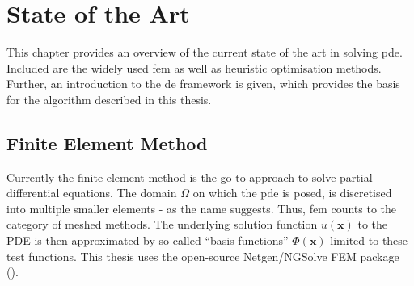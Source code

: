 \documentclass[./\jobname.tex]{subfiles}
\begin{document}
\chapter{State of the Art}
\label{chap:state_of_the_art}
This chapter provides an overview of the current state of the art in solving \gls{pde}. Included are the widely used \gls{fem} as well as heuristic optimisation methods. Further, an introduction to the \gls{de} framework is given, which provides the basis for the algorithm described in this thesis. 

\section{Finite Element Method}
Currently the finite element method is the go-to approach to solve partial differential equations. The domain $\Omega$ on which the \gls{pde} is posed, is discretised into multiple smaller elements - as the name suggests. Thus, \gls{fem} counts to the category of meshed methods. The underlying solution function $u(\mathbf{x})$ to the PDE is then approximated by so called ``basis-functions'' $\Phi(\mathbf{x})$ limited to these test functions. This thesis uses the open-source Netgen/NGSolve FEM package (\cite{schoberl_ngsolvengsolve_2020}). 
\end{document}
